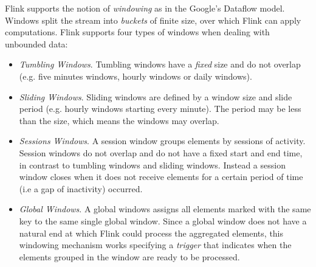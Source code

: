 Flink supports the notion of \emph{windowing} as in the Google's Dataflow model. Windows split the stream into \emph{buckets} of finite size, over which Flink can apply computations. Flink supports four types of windows when dealing with unbounded data:
\begin{itemize}
\item \emph{Tumbling Windows}. Tumbling windows have a \emph{fixed} size and do not overlap (e.g. five minutes windows, hourly windows or daily windows).
\item \emph{Sliding Windows}. Sliding windows are defined by a window size and slide period (e.g. hourly windows starting every minute). The period may be less than the size, which means the windows may overlap. 
\item \emph{Sessions Windows}. A session window groups elements by sessions of activity. Session windows do not overlap and do not have a fixed start and end time, in contrast to tumbling windows and sliding windows. Instead a session window closes when it does not receive elements for a certain period of time (i.e a gap of inactivity) occurred. 
\item \emph{Global Windows}. A global windows assigns all elements marked with the same key to the same single global window. Since a global window does not have a natural end at which Flink could process the aggregated elements, this windowing mechanism works specifying a \emph{trigger} that indicates when the elements grouped in the window are ready to be processed. 
\end{itemize}

